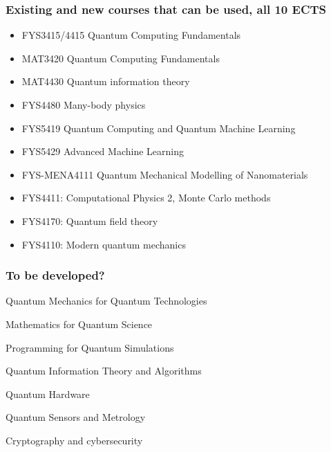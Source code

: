 \documentclass{beamer}
\begin{document}
\begin{frame}
\frametitle{Existing and new courses that can be used, all 10 ECTS}
\begin{itemize}
    \item FYS3415/4415 Quantum Computing Fundamentals
    \item MAT3420 Quantum Computing Fundamentals
    \item MAT4430 Quantum information theory
    \item FYS4480 Many-body physics
    \item FYS5419 Quantum Computing and Quantum Machine Learning
    \item FYS5429 Advanced Machine Learning
    \item FYS-MENA4111 Quantum Mechanical Modelling of Nanomaterials
    \item FYS4411: Computational Physics 2, Monte Carlo methods
    \item FYS4170: Quantum field theory
    \item FYS4110: Modern quantum mechanics
\end{itemize}

\end{frame}


\begin{frame}
\frametitle{To be developed?}
    \item Quantum Mechanics for Quantum Technologies
    \item Mathematics for Quantum Science 
    \item Programming for Quantum Simulations
    \item Quantum Information Theory and Algorithms
    \item Quantum Hardware
    \item Quantum Sensors and Metrology
    \item Cryptography and cybersecurity
\begin{itemize}

\end{itemize}

\end{frame}
\end{document}
